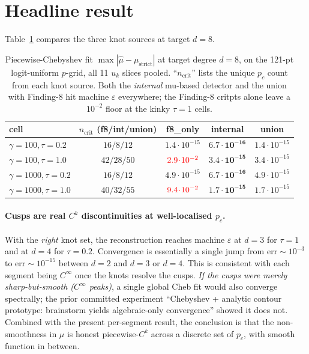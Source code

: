 \documentclass[11pt,a4paper]{article}
\begin{document}
\section{Headline result}

Table~\ref{tab:summary} compares the three knot sources at target $d{=}8$.

\begin{table}[h]
\centering
\small
\begin{tabular}{lcccc}
\toprule
cell & $n_\mathrm{crit}$ (f8/int/union)
  & f8\_only & internal & union \\
\midrule
$\gamma{=}100,\tau{=}0.2$  & $16 / 8 / 12$    & $1.4\!\cdot\!10^{-15}$ & $\mathbf{6.7\!\cdot\!10^{-16}}$ & $1.4\!\cdot\!10^{-15}$ \\
$\gamma{=}100,\tau{=}1.0$  & $42 / 28 / 50$   & $\color{red}2.9\!\cdot\!10^{-2}$ & $\mathbf{3.4\!\cdot\!10^{-15}}$ & $3.4\!\cdot\!10^{-15}$ \\
$\gamma{=}1000,\tau{=}0.2$ & $16 / 8 / 12$    & $4.9\!\cdot\!10^{-15}$ & $\mathbf{6.7\!\cdot\!10^{-16}}$ & $4.9\!\cdot\!10^{-15}$ \\
$\gamma{=}1000,\tau{=}1.0$ & $40 / 32 / 55$   & $\color{red}9.4\!\cdot\!10^{-2}$ & $\mathbf{1.7\!\cdot\!10^{-15}}$ & $1.7\!\cdot\!10^{-15}$ \\
\bottomrule
\end{tabular}
\caption{Piecewise-Chebyshev fit $\max|\hat\mu-\mu_\mathrm{strict}|$ at
  target degree $d{=}8$, on the 121-pt logit-uniform $p$-grid, all 11
  $u_k$ slices pooled. ``$n_\mathrm{crit}$'' lists the unique $p_c$ count
  from each knot source. Both the \emph{internal} mu-based detector and
  the union with Finding-8 hit machine $\varepsilon$ everywhere; the
  Finding-8 critpts alone leave a $10^{-2}$ floor at the kinky
  $\tau{=}1$ cells.}
\label{tab:summary}
\end{table}

\paragraph{Cusps are real $C^k$ discontinuities at well-localised
$p_c$.}
With the \emph{right} knot set, the reconstruction reaches machine
$\varepsilon$ at $d{=}3$ for $\tau{=}1$ and at $d{=}4$ for $\tau{=}0.2$.
Convergence is essentially a single jump from
$\mathrm{err}\sim 10^{-3}$ to $\mathrm{err}\sim 10^{-15}$ between $d{=}2$
and $d{=}3$ or $d{=}4$. This is consistent with each segment being
$C^\infty$ once the knots resolve the cusps. \emph{If the cusps were
merely sharp-but-smooth ($C^\infty$ peaks)}, a single global Cheb fit
would also converge spectrally; the prior committed experiment
``Chebyshev + analytic contour prototype: brainstorm yields algebraic-only
convergence'' showed it does not. Combined with the present per-segment
result, the conclusion is that the non-smoothness in $\mu$ is honest
piecewise-$C^k$ across a discrete set of $p_c$, with smooth function in
between.
\end{document}
